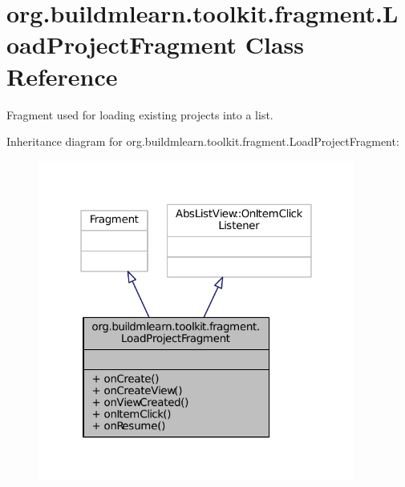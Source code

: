\hypertarget{classorg_1_1buildmlearn_1_1toolkit_1_1fragment_1_1LoadProjectFragment}{\section{org.\-buildmlearn.\-toolkit.\-fragment.\-Load\-Project\-Fragment Class Reference}
\label{classorg_1_1buildmlearn_1_1toolkit_1_1fragment_1_1LoadProjectFragment}
}


Fragment used for loading existing projects into a list.  




Inheritance diagram for org.\-buildmlearn.\-toolkit.\-fragment.\-Load\-Project\-Fragment\-:
\nopagebreak
\begin{figure}[H]
\begin{center}
\leavevmode
\includegraphics[width=295pt]{d0/dc4/classorg_1_1buildmlearn_1_1toolkit_1_1fragment_1_1LoadProjectFragment__inherit__graph}
\end{center}
\end{figure}


